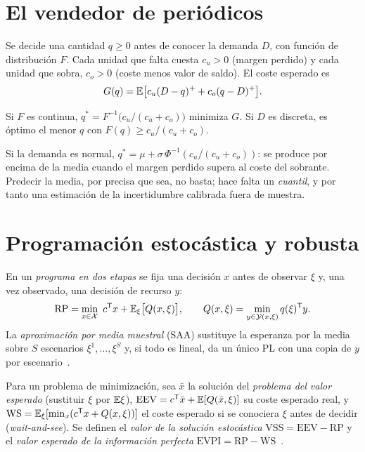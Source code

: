 \section{El vendedor de periódicos}

\begin{definicion}\label{def:newsvendor}
Se decide una cantidad $q\ge 0$ antes de conocer la demanda $D$, con función de distribución $F$. Cada unidad que falta cuesta $c_u>0$ (margen perdido) y cada unidad que sobra, $c_o>0$ (coste menos valor de saldo). El coste esperado es
\[
G(q)=\mathbb{E}\bigl[c_u(D-q)^{+}+c_o(q-D)^{+}\bigr].
\]
\end{definicion}

\begin{teorema}\label{teo:fractil}
Si $F$ es continua, $q^{*}=F^{-1}\!\bigl(c_u/(c_u+c_o)\bigr)$ minimiza $G$. Si $D$ es discreta, es óptimo el menor $q$ con $F(q)\ge c_u/(c_u+c_o)$.
\end{teorema}

Si la demanda es normal, $q^{*}=\mu+\sigma\,\Phi^{-1}(c_u/(c_u+c_o))$: se produce por encima de la media cuando el margen perdido supera al coste del sobrante. Predecir la media, por precisa que sea, no basta; hace falta un \emph{cuantil}, y por tanto una estimación de la incertidumbre calibrada fuera de muestra.

\section{Programación estocástica y robusta}

\begin{definicion}\label{def:dos-etapas}
En un \emph{programa en dos etapas} se fija una decisión $x$ antes de observar $\xi$ y, una vez observado, una decisión de recurso $y$:
\[
\mathrm{RP}=\min_{x\in\mathcal{X}}\ c^{\mathsf{T}} x+\mathbb{E}_\xi\bigl[Q(x,\xi)\bigr],\qquad Q(x,\xi)=\min_{y\in\mathcal{Y}(x,\xi)}q(\xi)^{\mathsf{T}} y .
\]
La \emph{aproximación por media muestral} (SAA) sustituye la esperanza por la media sobre $S$ escenarios $\xi^{1},\dots,\xi^{S}$ y, si todo es lineal, da un único PL con una copia de $y$ por escenario~\cite{ee364stoch}.
\end{definicion}

\begin{definicion}\label{def:vss}
Para un problema de minimización, sea $\bar x$ la solución del \emph{problema del valor esperado} (sustituir $\xi$ por $\mathbb{E}\xi$), $\mathrm{EEV}=c^{\mathsf{T}}\bar x+\mathbb{E}[Q(\bar x,\xi)]$ su coste esperado real, y $\mathrm{WS}=\mathbb{E}_\xi[\min_x(c^{\mathsf{T}} x+Q(x,\xi))]$ el coste esperado si se conociera $\xi$ antes de decidir (\emph{wait-and-see}). Se definen el \emph{valor de la solución estocástica} $\mathrm{VSS}=\mathrm{EEV}-\mathrm{RP}$ y el \emph{valor esperado de la información perfecta} $\mathrm{EVPI}=\mathrm{RP}-\mathrm{WS}$~\cite{bl}.
\end{definicion}


